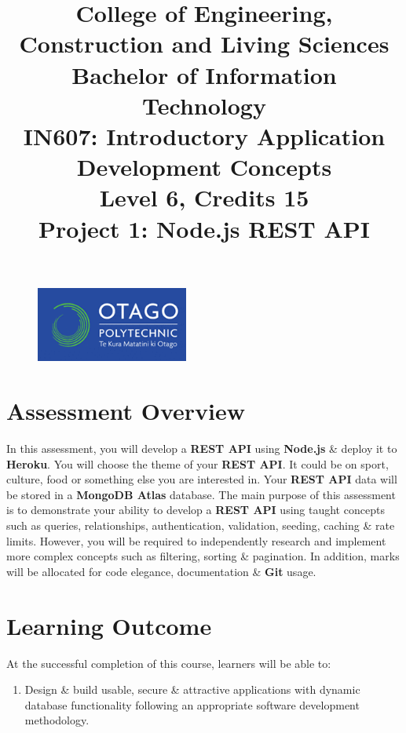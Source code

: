 \documentclass{article}
\author{}
\begin{document}
\begin{figure}
    \centering
    \includegraphics[width=50mm]{../img/logo.png}
\end{figure}

\title{College of Engineering, Construction and Living Sciences\\Bachelor of Information Technology\\IN607: Introductory Application Development Concepts\\Level 6, Credits 15\\\textbf{Project 1: Node.js REST API}}
\date{}
\maketitle

\section*{Assessment Overview}
In this assessment, you will develop a \textbf{REST API} using \textbf{Node.js} \& deploy it to \textbf{Heroku}. You will choose the theme of your \textbf{REST API}. It could be on sport, culture, food or something else you are interested in. Your \textbf{REST API} data will be stored in a \textbf{MongoDB Atlas} database. The main purpose of this assessment is to demonstrate your ability to develop a \textbf{REST API} using taught concepts such as queries, relationships, authentication, validation, seeding, caching \& rate limits. However, you will be required to independently research and implement more complex concepts such as filtering, sorting \& pagination. In addition, marks will be allocated for code elegance, documentation \& \textbf{Git} usage. 

\section*{Learning Outcome}
At the successful completion of this course, learners will be able to:
\begin{enumerate}
    \item Design \& build usable, secure \& attractive applications with dynamic database functionality following an appropriate software development methodology.
\end{enumerate}
\end{document}
